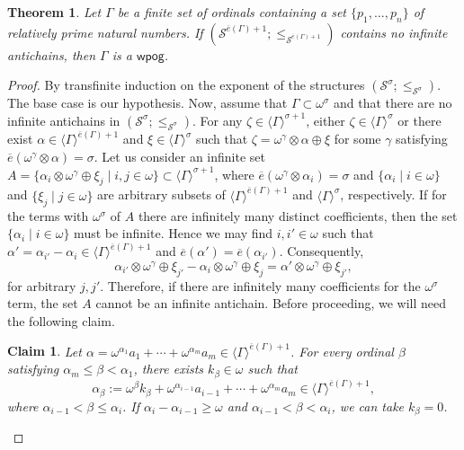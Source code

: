 \documentclass[10pt,a4paper]{amsart}
\newtheorem{theorem}{Theorem}
\newtheorem{claim}{Claim}
\begin{document}
\begin{theorem}\label{charwpog}
    Let $\Gamma$ be a finite set of ordinals containing a set $\{p_1,\dots,p_n\}$ of relatively prime natural numbers. If $(\mathcal{S}^{\overline{e}(\Gamma)+1};\leq_{\mathcal{S}^{\overline{e}(\Gamma)+1}})$ contains no infinite antichains, then $\Gamma$ is a $\mathsf{wpog}$.
\end{theorem}

\begin{proof}
    By transfinite induction on the exponent of the structures $(\mathcal{S}^{\sigma};\leq_{\mathcal{S}^{\sigma}})$. The base case is our hypothesis. Now, assume that $\Gamma\subset\omega^{\sigma}$ and that there are no infinite antichains in $(\mathcal{S}^{\sigma};\leq_{\mathcal{S}^{\sigma}})$. For any $\zeta \in \langle \Gamma \rangle^{\sigma + 1}$, either $\zeta\in\langle\Gamma\rangle^{\sigma}$ or there exist $\alpha \in \langle \Gamma \rangle^{\overline{e}(\Gamma) + 1}$ and $\xi \in \langle \Gamma \rangle^{\sigma}$ such that $\zeta = \omega^{\gamma} \otimes \alpha \oplus \xi$ for some $\gamma $ satisfying $\overline{e}(\omega^\gamma\otimes\alpha)=\sigma $. Let us consider an infinite set \( A= \{\alpha_i \otimes \omega^{\gamma} \oplus \xi_j \mid i,j \in \omega\}\subset\langle\Gamma\rangle^{\sigma+1}\), where $\overline{e}(\omega^\gamma\otimes\alpha_i)=\sigma $ and $\{\alpha_i \mid i\in\omega\}$ and $\{\xi_j \mid j\in\omega\}$ are arbitrary subsets of $\langle \Gamma \rangle^{\overline{e}(\Gamma)+1}$ and $\langle \Gamma \rangle^{\sigma}$, respectively. If for the terms with $\omega^\sigma$ of $A$ there are infinitely many distinct coefficients, then the set $\{\alpha_i \mid i\in\omega\}$ must be infinite. Hence we may find $i,i'\in\omega$ such that $\alpha' = \alpha_{i'} - \alpha_i \in \langle \Gamma \rangle^{\overline{e}(\Gamma)+1}$ and $\overline{e}(\alpha') = \overline{e}(\alpha_{i'})$. Consequently, \[ \alpha_{i'} \otimes \omega^{\gamma} \oplus \xi_{j'} -\alpha_i \otimes \omega^{\gamma} \oplus \xi_j = \alpha' \otimes \omega^{\gamma} \oplus \xi_{j'}, \] for arbitrary $j,j'$. Therefore, if there are infinitely many coefficients for the $\omega^\sigma$ term, the set $A$ cannot be an infinite antichain. Before proceeding, we will need the following claim.
\begin{claim}
    Let $\alpha=\omega^{\alpha_1} a_1 + \cdots + \omega^{\alpha_m} a_m\in \langle \Gamma \rangle^{\overline{e}(\Gamma)+1}$. For every ordinal $\beta$ satisfying $\alpha_m\leq\beta<\alpha_1 $, there exists $k_{\beta}\in \omega$ such that \[\alpha_\beta:=\omega^{\beta}k_{\beta}  + \omega^{\alpha_{i-1}} a_{i-1}+ \cdots + \omega^{\alpha_m} a_m \in\langle \Gamma \rangle^{\overline{e}(\Gamma)+1}, \] where $\alpha_{i-1}<\beta\leq\alpha_i$. If $\alpha_i-\alpha_{i-1}\geq\omega$ and $\alpha_{i-1}<\beta<\alpha_i$, we can take $k_\beta=0$.

\end{claim}
\end{proof}
\end{document}
